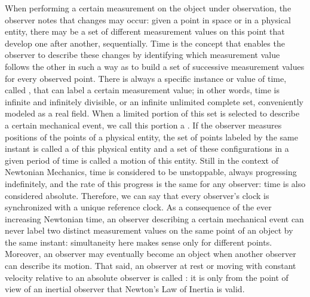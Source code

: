 When performing a certain measurement on the object under observation, the observer notes that changes may occur: given a point in space or in a physical entity, there may be a set of different measurement values on this point that develop one after another, sequentially. Time is the concept that enables the observer to describe these changes by identifying which measurement value follows the other in such a way as to build a set of successive measurement values for every observed point.  There is always a specific instance or value of time, called , that can label a certain measurement value; in other words, time is infinite and infinitely divisible, or an infinite unlimited complete set, conveniently modeled as a real field. When a limited portion of this set is selected to describe a certain mechanical event, we call this portion a . If the observer measures positions of the points of a physical entity, the set of points labeled by the same instant is called a  of this physical entity and a set of these configurations in a given period of time is called a motion of this entity. Still in the context of Newtonian Mechanics, time is considered to be unstoppable, always progressing indefinitely, and the rate of this progress is the same for any observer: time is also considered absolute. Therefore, we can say that every observer's clock is synchronized with a unique reference clock. As a consequence of the ever increasing Newtonian time, an observer describing a certain mechanical event can never label two distinct measurement values on the same point of an object by the same instant: simultaneity here makes sense only for different points. Moreover, an observer may eventually become an object when another observer can describe its motion. That said, an observer at rest or moving with constant velocity relative to an absolute observer is called : it is only from the point of view of an inertial observer that Newton's Law of Inertia is valid.   

